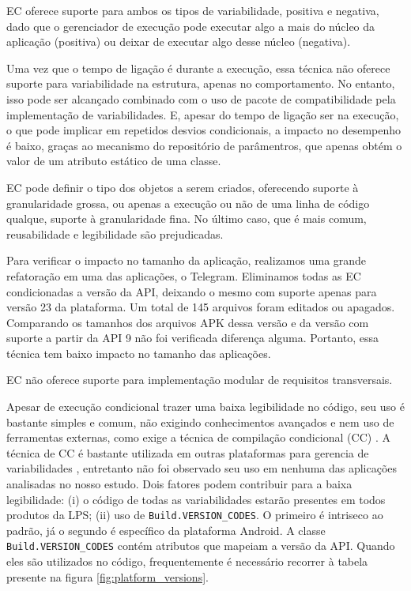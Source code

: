 EC oferece suporte para ambos os tipos de variabilidade, positiva e negativa,
dado que o gerenciador de execução pode executar algo a mais do núcleo da aplicação
(positiva) ou deixar de executar algo desse núcleo (negativa).

Uma vez que o tempo de ligação é durante a  execução, essa técnica não oferece
suporte para variabilidade na estrutura, apenas no comportamento. No entanto,
isso pode ser alcançado combinado com o uso de pacote de compatibilidade pela
implementação de variabilidades. E, apesar do tempo de ligação ser na execução,
o que pode implicar em repetidos desvios condicionais, a impacto no desempenho é
baixo, graças ao mecanismo do repositório de parâmentros, que apenas obtém o valor
de um atributo estático de uma classe.

EC pode definir o tipo dos objetos a serem criados, oferecendo suporte à granularidade
grossa, ou apenas a execução ou não de uma linha de código qualque, suporte à
granularidade fina. No último caso, que é mais comum,  reusabilidade e
legibilidade são prejudicadas.

Para verificar o impacto no tamanho da aplicação, realizamos uma grande refatoração
em uma das aplicações, o Telegram. Eliminamos todas as EC condicionadas a versão da
API, deixando o mesmo com suporte apenas para versão 23 da plataforma. Um total
de 145 arquivos foram editados ou apagados. Comparando os tamanhos dos arquivos
APK dessa versão e da versão com suporte a partir da API 9 não foi verificada
diferença alguma. Portanto, essa técnica tem baixo impacto no tamanho das aplicações.

EC não oferece suporte para implementação modular de requisitos transversais.

Apesar de execução condicional trazer uma baixa legibilidade no código, seu uso
é bastante simples e comum, não exigindo conhecimentos avançados e nem uso de
ferramentas externas, como exige a técnica de compilação condicional (CC) \cite{Medeiros2015}.
A técnica de CC é bastante utilizada em outras plataformas para gerencia de
variabilidades \cite{Liebig2010}, entretanto não foi observado seu uso em
nenhuma das aplicações analisadas no nosso estudo. Dois fatores podem contribuir
para a baixa legibilidade: (i) o código de todas as variabilidades estarão presentes
em todos produtos da LPS; (ii) uso de \texttt{Build.VERSION\_CODES}. O primeiro é 
intriseco ao padrão, já o segundo é específico da plataforma Android. A classe
\texttt{Build.VERSION\_CODES} contém atributos que mapeiam a versão da API. Quando
eles são utilizados no código, frequentemente é necessário recorrer à tabela presente
na figura \ref{fig:platform_versions}.

